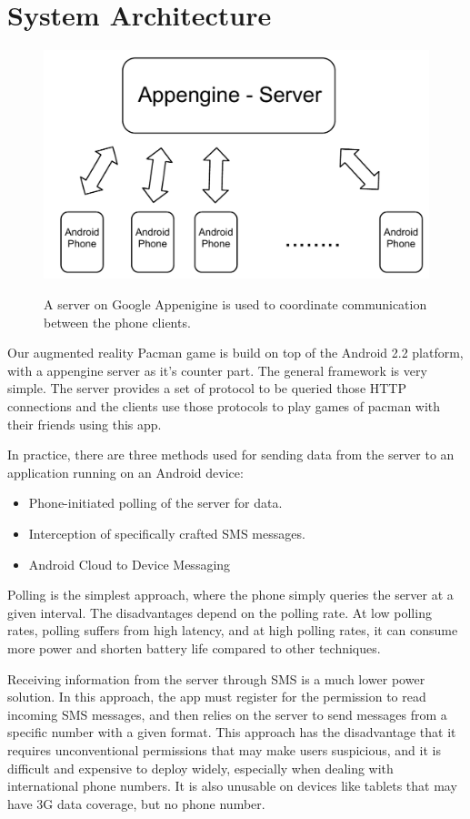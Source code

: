 \documentclass{acm_proc_article-sp}
\begin{document}
\section{System Architecture}

\begin{figure}
\centering
\includegraphics[scale=0.4]{figs/ServerArchitecture}
\label{fig:ServerArchitecture}
\caption{A server on Google Appenigine is used to coordinate communication between the phone clients.}
\end{figure}

Our augmented reality Pacman game is build on top of the Android 2.2
platform, with a appengine server as it's counter part. The general
framework is very simple. The server provides a set of protocol to be
queried those HTTP connections and the clients use those protocols to
play games of pacman with their friends using this app.

In practice, there are three methods used for sending data from the server to
an application running on an Android device:
\begin{itemize}
\item Phone-initiated polling of the server for data.
\item Interception of specifically crafted SMS messages.
\item Android Cloud to Device Messaging
\end{itemize}

Polling is the simplest approach, where the phone simply queries the server at
a given interval. The disadvantages depend on the polling rate. At low polling
rates, polling suffers from high latency, and at high polling rates, it can
consume more power and shorten battery life compared to other techniques.

Receiving information from the server through SMS is a much lower power
solution. In this approach, the app must register for the permission to read
incoming SMS messages, and then relies on the server to send messages from a
specific number with a given format. This approach has the disadvantage that it
requires unconventional permissions that may make users suspicious, and it is
difficult and expensive to deploy widely, especially when dealing with
international phone numbers. It is also unusable on devices like tablets that
may have 3G data coverage, but no phone number.
\end{document}
